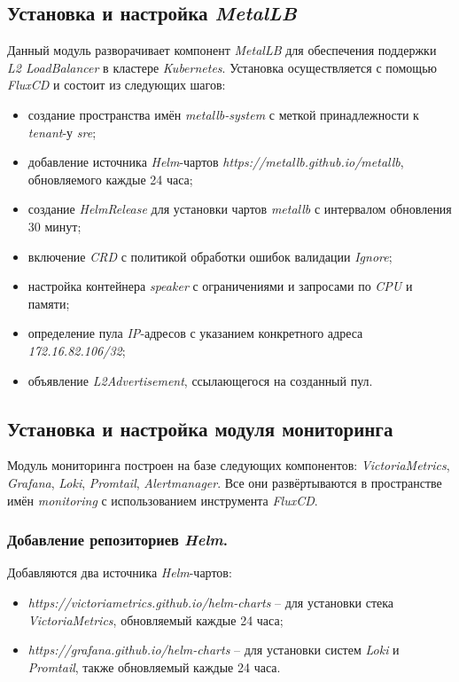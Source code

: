 \subsection{Установка и настройка \textit{MetalLB}}

Данный модуль разворачивает компонент \textit{MetalLB} для обеспечения поддержки \textit{L2 LoadBalancer} в кластере \textit{Kubernetes}. Установка осуществляется с помощью \textit{FluxCD} и состоит из следующих шагов:

\begin{itemize}
    \item создание пространства имён \textit{metallb-system} с меткой принадлежности к \textit{tenant}-у \textit{sre};
    \item добавление источника \textit{Helm}-чартов \textit{https://metallb.github.io/metallb}, обновляемого каждые 24 часа;
    \item создание \textit{HelmRelease} для установки чартов \textit{metallb} с интервалом обновления 30 минут;
    \item включение \textit{CRD} с политикой обработки ошибок валидации \textit{Ignore};
    \item настройка контейнера \textit{speaker} с ограничениями и запросами по \textit{CPU} и памяти;
    \item определение пула \textit{IP}-адресов с указанием конкретного адреса \textit{172.16.82.106/32};
    \item объявление \textit{L2Advertisement}, ссылающегося на созданный пул.
\end{itemize}



\subsection{Установка и настройка модуля мониторинга}

Модуль мониторинга построен на базе следующих компонентов: \textit{VictoriaMetrics}, \textit{Grafana}, \textit{Loki}, \textit{Promtail}, \textit{Alertmanager}. Все они развёртываются в пространстве имён \textit{monitoring} с использованием инструмента \textit{FluxCD}.

\subsubsection{Добавление репозиториев \textit{Helm}.} Добавляются два источника \textit{Helm}-чартов:

\begin{itemize}
    \item \textit{https://victoriametrics.github.io/helm-charts} -- для установки стека \textit{VictoriaMetrics}, обновляемый каждые 24 часа;
    \item \textit{https://grafana.github.io/helm-charts} -- для установки систем \textit{Loki} и \textit{Promtail}, также обновляемый каждые 24 часа.
\end{itemize}

